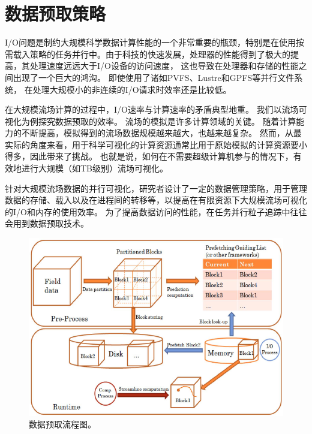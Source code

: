 \section{数据预取策略}


I/O问题是制约大规模科学数据计算性能的一个非常重要的瓶颈，特别是在使用按需载入策略的任务并行中。由于科技的快速发展，处理器的性能得到了极大的提高，其处理速度远远大于I/O设备的访问速度，
这也导致在处理器和存储的性能之间出现了一个巨大的鸿沟。
即使使用了诸如PVFS\parencite{CarnsLRT00}、Lustre\parencite{Cluster02}和GPFS\parencite{SchmuckH02}等并行文件系统，
在处理大规模小的非连续的I/O请求时效率还是比较低。

在大规模流场计算的过程中，I/O速率与计算速率的矛盾典型地重。
我们以流场可视化为例探究数据预取的效率。
流场的模拟是许多计算领域的关键。
随着计算能力的不断提高，模拟得到的流场数据规模越来越大，也越来越复杂。
然而，从最实际的角度来看，用于科学可视化的计算资源通常比用于原始模拟的计算资源要小得多，因此带来了挑战。
也就是说，如何在不需要超级计算机参与的情况下，有效地进行大规模（如TB级别）流场可视化。

针对大规模流场数据的并行可视化，研究者设计了一定的数据管理策略，用于管理数据的存储、载入以及在进程间的转移等，以提高在有限资源下大规模流场可视化的I/O和内存的使用效率。
为了提高数据访问的性能，在任务并行粒子追踪中往往会用到数据预取技术。

\begin{figure}[h]
  \centering
  \includegraphics[width=.8\linewidth,keepaspectratio]{image/prefetch/prefetch_pipeline.png}
  \caption{
   数据预取流程图\parencite{Guo2017WL}。
 }
\label{fig:prefetch:prefetch_pipeline}
\end{figure}

